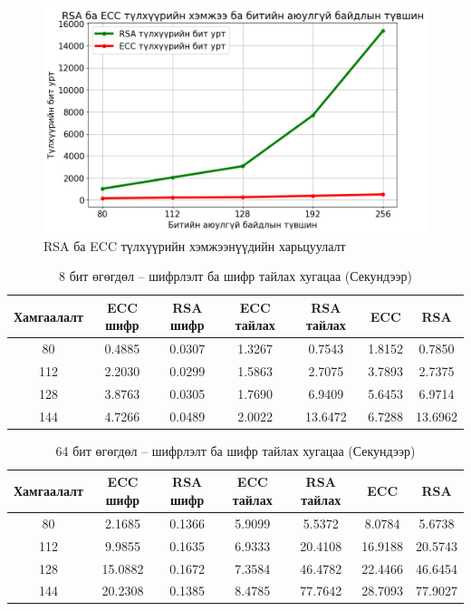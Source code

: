 \begin{figure}[h]
	\centering
	\includegraphics[scale=0.6]{assets/graphs/keysize.png}
	\caption{RSA ба ECC түлхүүрийн хэмжээнүүдийн харьцуулалт}
	\label{fig:architecture}
\end{figure}

\begin{table}
	\centering
	\caption{8 бит өгөгдөл – шифрлэлт ба шифр тайлах хугацаа (Секундээр) \cite{RSAvsECC}}
	\begin{tabular}{|c|c|c|c|c|c|c|}
		\hline
		Хамгаалалт & ECC шифр & RSA шифр & ECC тайлах & RSA тайлах & ECC    & RSA     \\
		\hline
		80         & 0.4885   & 0.0307   & 1.3267     & 0.7543     & 1.8152 & 0.7850  \\
		112        & 2.2030   & 0.0299   & 1.5863     & 2.7075     & 3.7893 & 2.7375  \\
		128        & 3.8763   & 0.0305   & 1.7690     & 6.9409     & 5.6453 & 6.9714  \\
		144        & 4.7266   & 0.0489   & 2.0022     & 13.6472    & 6.7288 & 13.6962 \\
		\hline
	\end{tabular}
\end{table}

\begin{table}
	\centering
	\caption{64 бит өгөгдөл – шифрлэлт ба шифр тайлах хугацаа (Секундээр) \cite{RSAvsECC}}
	\begin{tabular}{|c|c|c|c|c|c|c|}
		\hline
		Хамгаалалт & ECC шифр & RSA шифр & ECC тайлах & RSA тайлах & ECC     & RSA     \\
		\hline
		80         & 2.1685   & 0.1366   & 5.9099     & 5.5372     & 8.0784  & 5.6738  \\
		112        & 9.9855   & 0.1635   & 6.9333     & 20.4108    & 16.9188 & 20.5743 \\
		128        & 15.0882  & 0.1672   & 7.3584     & 46.4782    & 22.4466 & 46.6454 \\
		144        & 20.2308  & 0.1385   & 8.4785     & 77.7642    & 28.7093 & 77.9027 \\
		\hline
	\end{tabular}
\end{table}

